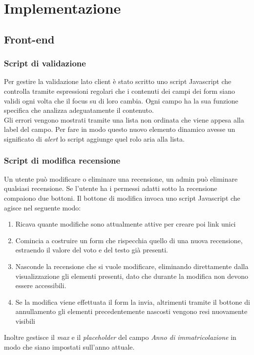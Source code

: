 \section{Implementazione}

\subsection{Front-end}

\subsubsection{Script di validazione}
Per gestire la validazione lato client è stato scritto uno script Javascript che controlla tramite espressioni regolari che i contenuti dei campi dei form siano validi ogni volta che il focus su di loro cambia. Ogni campo ha la sua funzione specifica che analizza adeguatamente il contenuto.\\ Gli errori vengono mostrati tramite una lista non ordinata che viene appesa alla label del campo. Per fare in modo questo nuovo elemento dinamico avesse un significato di \textit{alert} lo script aggiunge quel rolo aria alla lista.

\subsubsection{Script di modifica recensione}
Un utente può modificare o eliminare una recensione, un admin può eliminare qualsiasi recensione. Se l'utente ha i permessi adatti sotto la recensione compaiono due bottoni. Il bottone di modifica invoca uno script Javascript che agisce nel seguente modo:
\begin{enumerate}
    \item Ricava quante modifiche sono attualmente attive per creare poi link unici
    \item Comincia a costruire un form che rispecchia quello di una nuova recensione, estraendo il valore del voto e del testo già presenti.
    \item Nasconde la recensione che si vuole modificare, eliminando direttamente dalla visualizzazione gli elementi presenti, dato che durante la modifica non devono essere accessibili.
    \item Se la modifica viene effettuata il form la invia, altrimenti tramite il bottone di annullamento gli elementi precedentemente nascosti vengono resi nuovamente visibili 
\end{enumerate}
Inoltre gestisce il \textit{max} e il \textit{placeholder} del campo \textit{Anno di immatricolazione} in modo che siano impostati sull'anno attuale.

